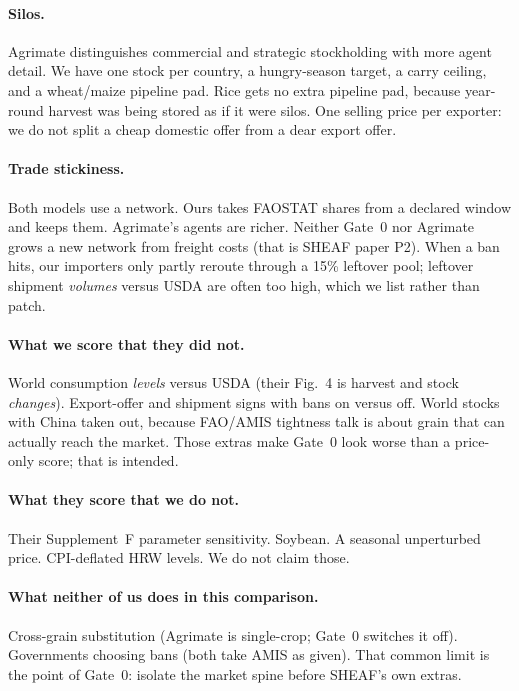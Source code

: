\documentclass[11pt,a4paper]{article}
\begin{document}
\paragraph{Silos.}
Agrimate distinguishes commercial and strategic stockholding with more
agent detail. We have one stock per country, a hungry-season target, a
carry ceiling, and a wheat/maize pipeline pad. Rice gets no extra
pipeline pad, because year-round harvest was being stored as if it were
silos. One selling price per exporter: we do not split a cheap domestic
offer from a dear export offer.

\paragraph{Trade stickiness.}
Both models use a network. Ours takes FAOSTAT shares from a declared
window and keeps them. Agrimate's agents are richer. Neither Gate~0 nor
Agrimate grows a new network from freight costs (that is SHEAF paper P2).
When a ban hits, our importers only partly reroute through a 15\% leftover
pool; leftover shipment \emph{volumes} versus USDA are often too high,
which we list rather than patch.

\paragraph{What we score that they did not.}
World consumption \emph{levels} versus USDA (their Fig.~4 is harvest and
stock \emph{changes}). Export-offer and shipment signs with bans on versus
off. World stocks with China taken out, because FAO/AMIS tightness talk
is about grain that can actually reach the market. Those extras make
Gate~0 look worse than a price-only score; that is intended.

\paragraph{What they score that we do not.}
Their Supplement~F parameter sensitivity. Soybean. A seasonal unperturbed
price. CPI-deflated HRW levels. We do not claim those.

\paragraph{What neither of us does in this comparison.}
Cross-grain substitution (Agrimate is single-crop; Gate~0 switches it
off). Governments choosing bans (both take AMIS as given). That common
limit is the point of Gate~0: isolate the market spine before SHEAF's
own extras.
\end{document}
